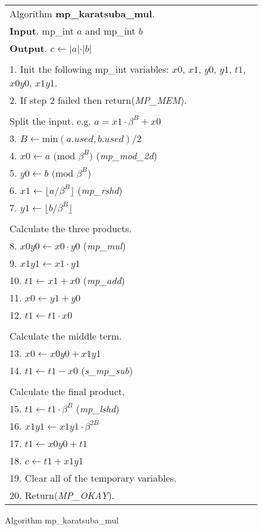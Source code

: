 \documentclass[b5paper]{book}
\begin{document}
\newpage\begin{figure}[!here]
\begin{small}
\begin{center}
\begin{tabular}{l}
\hline Algorithm \textbf{mp\_karatsuba\_mul}. \\
\textbf{Input}.   mp\_int $a$ and mp\_int $b$ \\
\textbf{Output}.  $c \leftarrow \vert a \vert \cdot \vert b \vert$ \\
\hline \\
1.  Init the following mp\_int variables: $x0$, $x1$, $y0$, $y1$, $t1$, $x0y0$, $x1y1$.\\
2.  If step 2 failed then return(\textit{MP\_MEM}). \\
\\
Split the input.  e.g. $a = x1 \cdot \beta^B + x0$ \\
3.  $B \leftarrow \mbox{min}(a.used, b.used)/2$ \\
4.  $x0 \leftarrow a \mbox{ (mod }\beta^B\mbox{)}$ (\textit{mp\_mod\_2d}) \\
5.  $y0 \leftarrow b \mbox{ (mod }\beta^B\mbox{)}$ \\
6.  $x1 \leftarrow \lfloor a / \beta^B \rfloor$ (\textit{mp\_rshd}) \\
7.  $y1 \leftarrow \lfloor b / \beta^B \rfloor$ \\
\\
Calculate the three products. \\
8.  $x0y0 \leftarrow x0 \cdot y0$ (\textit{mp\_mul}) \\
9.  $x1y1 \leftarrow x1 \cdot y1$ \\
10.  $t1 \leftarrow x1 + x0$ (\textit{mp\_add}) \\
11.  $x0 \leftarrow y1 + y0$ \\
12.  $t1 \leftarrow t1 \cdot x0$ \\
\\
Calculate the middle term. \\
13.  $x0 \leftarrow x0y0 + x1y1$ \\
14.  $t1 \leftarrow t1 - x0$ (\textit{s\_mp\_sub}) \\
\\
Calculate the final product. \\
15.  $t1 \leftarrow t1 \cdot \beta^B$ (\textit{mp\_lshd}) \\
16.  $x1y1 \leftarrow x1y1 \cdot \beta^{2B}$ \\
17.  $t1 \leftarrow x0y0 + t1$ \\
18.  $c \leftarrow t1 + x1y1$ \\
19.  Clear all of the temporary variables. \\
20.  Return(\textit{MP\_OKAY}).\\
\hline 
\end{tabular}
\end{center}
\end{small}
\caption{Algorithm mp\_karatsuba\_mul}
\end{figure}
\end{document}
